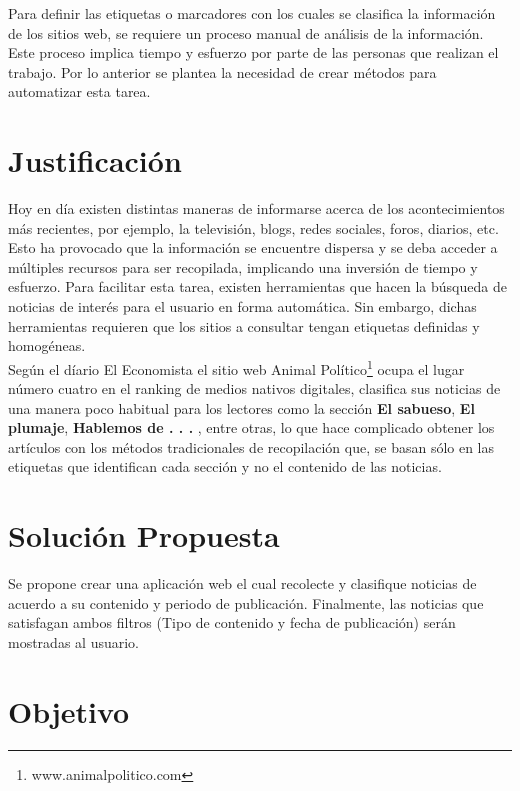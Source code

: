 Para definir las etiquetas o marcadores con los cuales se clasifica la información de los sitios web, se requiere un proceso manual de análisis de la información. Este proceso implica tiempo y esfuerzo por parte de las personas que realizan el trabajo. Por lo anterior se plantea la necesidad de crear métodos para automatizar esta tarea. 

\section{Justificación}



Hoy en día existen distintas maneras de informarse acerca de los acontecimientos más recientes, por ejemplo, la televisión, blogs, redes sociales, foros,
diarios, etc. Esto ha provocado que la información se encuentre dispersa y
se deba acceder a múltiples recursos para ser recopilada, implicando
una inversión de tiempo y esfuerzo. Para facilitar esta tarea, existen herramientas
que hacen la búsqueda de noticias de interés para el usuario en forma automática. Sin embargo, dichas herramientas requieren que los sitios a consultar tengan etiquetas definidas y homogéneas.\\

Según el díario El Economista \cite{tres} el sitio web Animal Político\footnote{www.animalpolitico.com}
ocupa el lugar número cuatro en el ranking de medios nativos digitales, clasifica sus noticias de una manera poco habitual para los lectores como la sección
\textbf{El sabueso}, \textbf{El plumaje}, \textbf{Hablemos de . . . }, entre otras, lo que hace complicado obtener los artículos con los métodos tradicionales de recopilación que,
se basan sólo en las etiquetas que identifican cada sección y no el contenido de
las noticias.


\section{Solución Propuesta}

Se propone crear una aplicación web el cual recolecte y clasifique noticias de acuerdo 
a su contenido y periodo de publicación. Finalmente, las noticias
que satisfagan ambos filtros (Tipo de contenido y fecha de publicación) serán mostradas al usuario.

\section{Objetivo}

